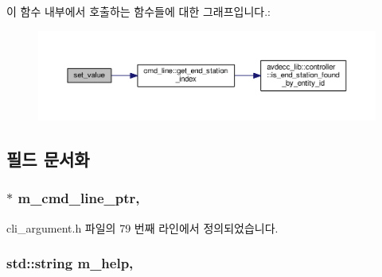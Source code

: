 이 함수 내부에서 호출하는 함수들에 대한 그래프입니다.\+:
\nopagebreak
\begin{figure}[H]
\begin{center}
\leavevmode
\includegraphics[width=350pt]{classcli__argument__end__station_aa768ad337cc685b348672423139875a4_cgraph}
\end{center}
\end{figure}




\subsection{필드 문서화}
\subsubsection[{\texorpdfstring{m\+\_\+cmd\+\_\+line\+\_\+ptr}{m_cmd_line_ptr}}]{$\ast$ m\+\_\+cmd\+\_\+line\+\_\+ptr\hspace{0.3cm}{\ttfamily [protected]}, {\ttfamily [inherited]}}\hypertarget{classcli__argument_a802ef904236d4228f1b8edb3a96eb9cd}{}\label{classcli__argument_a802ef904236d4228f1b8edb3a96eb9cd}


cli\+\_\+argument.\+h 파일의 79 번째 라인에서 정의되었습니다.

\subsubsection[{\texorpdfstring{m\+\_\+help}{m_help}}]{\setlength{\rightskip}{0pt plus 5cm}std\+::string m\+\_\+help\hspace{0.3cm}{\ttfamily [protected]}, {\ttfamily [inherited]}}\hypertarget{classcli__argument_a3985971d45415a337f60ed183b445c96}{}\label{classcli__argument_a3985971d45415a337f60ed183b445c96}


